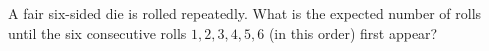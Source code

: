 A fair six-sided die is rolled repeatedly. What is the expected number of rolls until the six consecutive rolls $1,2,3,4,5,6$ (in this order) first appear?
